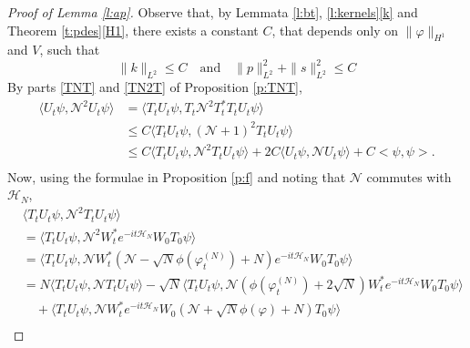 \documentclass[11pt,a4paper,draft,DIV11]{scrartcl}	%
\newcommand{\N}{\mathcal{N}}
\newcommand{\scal}[2]{\big<#1,#2\big>} %
\newcommand{\ph}{\varphi_t^{(N)}}	%
\begin{document}
\begin{proof}[Proof of Lemma \ref{l:ap}]
  Observe that, by Lemmata \ref{l:bt}, \ref{l:kernels}\ref{k} and Theorem
  \ref{t:pdes}\eqref{H1}, there exists a constant $C$, %
  that depends only on $\| \varphi \|_{H^1}$ and $V$, such that
  \begin{equation} \label{c2}
      \| k \|_{L^2} \le C %
\quad\text{and}\quad
      \| p \|_{L^2}^2 + \| s \|_{L^2}^2 \le C%
  \end{equation}
  By parts \eqref{TNT} and \eqref{TN2T} of Proposition \ref{p:TNT},
  \begin{equation}
    \label{ep4}
    \begin{split}
      \langle U_t \psi, \N^2 U_t \psi \rangle & = \langle T_t U_t \psi, T_t
      \N^2 T_t^* T_t U_t \psi \rangle \\
      & \le C \langle T_t U_t \psi, (\N+1)^2 T_t U_t \psi \rangle \\
      & \le C \langle T_t U_t \psi, \N^2 T_t U_t \psi \rangle + 2 C \langle
      U_t \psi, \N U_t \psi \rangle + C\scal{\psi}{\psi}. \\
    \end{split}
  \end{equation} 
  Now, using the formulae in Proposition \ref{p:f} and noting that $\N$
  commutes with $\mathcal{H}_N$,
  \begin{align*}
    & \langle T_t U_t \psi, \N^2 T_t U_t \psi \rangle \\
    & = \langle T_t U_t \psi, \N^2 W_t^* e^{-it \mathcal{H}_N} W_0 T_0 \psi \rangle
    \\
    & = \langle T_t U_t \psi, \N W_t^* \left(\N - \sqrt{N} \phi(\ph) + N\right)
    e^{-it \mathcal{H}_N} W_0 T_0 \psi \rangle \\
    & = N \langle T_t U_t \psi, \N T_t U_t \psi \rangle - \sqrt{N} \langle T_t
    U_t \psi, \N \left( \phi(\ph) + 2\sqrt{N}\right) W_t^* e^{-it\mathcal{H}_N} W_0 T_0 
    \psi \rangle \\
    & \quad + \langle T_t U_t \psi, \N W_t^* e^{-it\mathcal{H}_N} W_0 \left(\N +
    \sqrt{N} \phi(\varphi) + N\right) T_0 \psi \rangle \\

\end{align*}
\end{proof}
\end{document}
